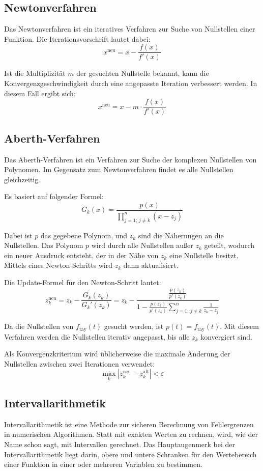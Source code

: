 \documentclass[
	ngerman,%
	accentcolor=9c,%
	ruledheaders=section,%
	class=report,%
	thesis={type=bachelor},%
	fontsize=11pt,%
	parskip=half-,%
	custommargins=true,%
	marginpar=false,%
]{tudapub}
\begin{document}
\subsection{Newtonverfahren}
Das Newtonverfahren ist ein iteratives Verfahren zur Suche von Nullstellen einer Funktion. 
Die Iterationsvorschrift lautet dabei:
\[x^\text{neu}=x-\frac{f(x)}{f'(x)}\]

Ist die Multiplizität \(m\) der gesuchten Nullstelle bekannt, kann die Konvergenzgeschwindigkeit durch eine angepasste Iteration verbessert werden. In diesem Fall ergibt sich:
\[x^\text{neu}=x-m \cdot \frac{f(x)}{f'(x)}\]


\subsection{Aberth-Verfahren}
Das Aberth-Verfahren ist ein Verfahren zur Suche der komplexen Nullstellen von Polynomen. 
Im Gegensatz zum Newtonverfahren findet es alle Nullstellen gleichzeitig.

Es basiert auf folgender Formel:
\[
G_k(x) = \frac{p(x)}{\prod_{j=1;\,j\neq k}^n (x - z_j)}
\]

Dabei ist \( p \) das gegebene Polynom, und \( z_k \) sind die Näherungen an die Nullstellen. Das Polynom \( p \) wird durch alle Nullstellen außer \( z_k \) geteilt, wodurch ein neuer Ausdruck entsteht, der in der Nähe von \( z_k \) eine Nullstelle besitzt. Mittels eines Newton-Schritts wird \( z_k \) dann aktualisiert.

Die Update-Formel für den Newton-Schritt lautet:
\[
z_k^{\text{neu}} = z_k-\frac{G_k(z_k)}{G_k'(z_k)}= z_k - \frac{\frac{p(z_k)}{p'(z_k)}}{  1 - \frac{p(z_k)}{p'(z_k)} \sum_{j=1;\,j \neq k}^n \frac{1}{z_k - z_j} }
\]

Da die Nullstellen von \( f_{\text{ray}}(t) \) gesucht werden, ist \( p(t) = f_{\text{ray}}(t) \). Mit diesem Verfahren werden die Nullstellen iterativ angepasst, bis alle \( z_k \) konvergiert sind.

Als Konvergenzkriterium wird üblicherweise die maximale Änderung der Nullstellen zwischen zwei Iterationen verwendet:
\[
\max_k \left| z_k^{\text{neu}} - z_k^{\text{alt}} \right| < \varepsilon
\]

\subsection{Intervallarithmetik}
Intervallarithmetik ist eine Methode zur sicheren Berechnung von Fehlergrenzen in numerischen Algorithmen. 
Statt mit exakten Werten zu rechnen, wird, wie der Name schon sagt, mit Intervallen gerechnet. 
Das Hauptaugenmerk bei der Intervallarithmetik liegt darin, obere und untere Schranken für den Wertebereich einer Funktion in einer oder mehreren Variablen zu bestimmen.
\end{document}

